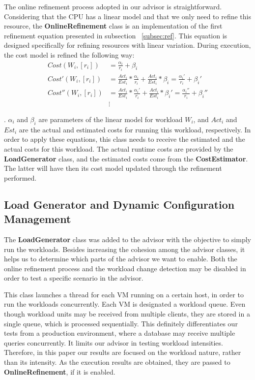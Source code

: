 The online refinement process adopted in our advisor is straightforward. Considering that the CPU has a linear model and that we only need to refine this resource, the \textbf{OnlineRefinement} class  is an implementation of the first refinement equation presented in subsection ~\ref{subsec:ref}. This equation is designed specifically for refining resources with linear variation. During execution, the cost model is refined the following way:
\begin{equation}
 \begin{split}
   Cost(W_{i}, [r_{i}]) & = \frac{\alpha_{i}}{r_{i}} +\beta_{i} \\
   Cost'(W_{i}, [r_{i}]) & = \frac{Act_{i}}{Est_{i}} * \frac{\alpha_{i}}{r_{i}} + \frac{Act_{i}}{Est_{i}} * \beta_{i} = \frac{\alpha_{i}'}{r_{i}} +\beta_{i}' \\
   Cost''(W_{i}, [r_{i}]) & = \frac{Act_{i}}{Est_{i}} * \frac{\alpha_{i}'}{r_{i}} + \frac{Act_{i}}{Est_{i}} * \beta_{i}' = \frac{\alpha_{i}''}{r_{i}} +\beta_{i}'' \\
    & \vdots
 \end{split}
\end{equation}

 . $\alpha_{i}$ and $\beta_{i}$ are parameters of the linear model for workload $W_{i}$, and $Act_{i}$ and $Est_{i}$ are the actual and estimated costs for running this workload, respectively. In order to apply these equations, this class needs to receive the estimated and the actual costs for this workload. The actual runtime costs are provided by the \textbf{LoadGenerator} class, and the estimated costs come from the \textbf{CostEstimator}. The latter will have then its cost model updated through the refinement performed.

\subsection{Load Generator and Dynamic Configuration Management}

The \textbf{LoadGenerator} class was added to the advisor with the objective to simply run the workloads. Besides increasing the cohesion among the advisor classes, it helps us to determine which parts of the advisor we want to enable. Both the online refinement process and the workload change detection may be disabled in order to test a specific scenario in the advisor.

This class launches a thread for each VM running on a certain host, in order to run the workloads concurrently. Each VM is designated a workload queue. Even though workload units may be received from multiple clients, they are stored in a single queue, which is processed sequentially. This definitely differentiates our tests from a production environment, where a database may receive multiple queries concurrently. It limits our advisor in testing workload intensities. Therefore, in this paper our results are focused on the workload nature, rather than its intensity. As the execution results are obtained, they are passed to \textbf{OnlineRefinement}, if it is enabled. 

